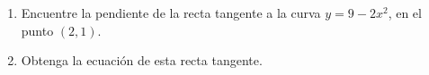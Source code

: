 \item 
    \begin{enumerate}
        \item Encuentre la pendiente de la recta tangente a la curva $y = 9 - 2x^2$, en el punto $(2, 1)$.
        \item Obtenga la ecuación de esta recta tangente.
    \end{enumerate}
